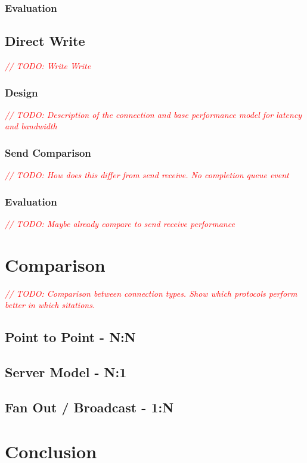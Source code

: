 \documentclass{article}
\newcommand{\todo}[1]{\textit{\textcolor{red}{// TODO: #1} }}
\theoremstyle{plain}
\theoremstyle{definition}
\theoremstyle{remark}
\begin{document}
\subsubsection{Evaluation}

\pagebreak
\subsection{Direct Write}
\todo{Write Write}
\subsubsection{Design}
\todo{Description of the connection and base performance model for latency and bandwidth}
\subsubsection{Send Comparison}
\todo{How does this differ from send receive. No completion queue event}
\subsubsection{Evaluation}
\todo{Maybe already compare to send receive performance}

\pagebreak


\pagebreak



\pagebreak
\section{Comparison}
\todo{Comparison between connection types. Show which protocols perform better in which sitations.}

\subsection{Point to Point - N:N}

\subsection{Server Model - N:1}

\subsection{Fan Out / Broadcast - 1:N}

\pagebreak
\section{Conclusion}



\pagebreak


{}
\end{document}
